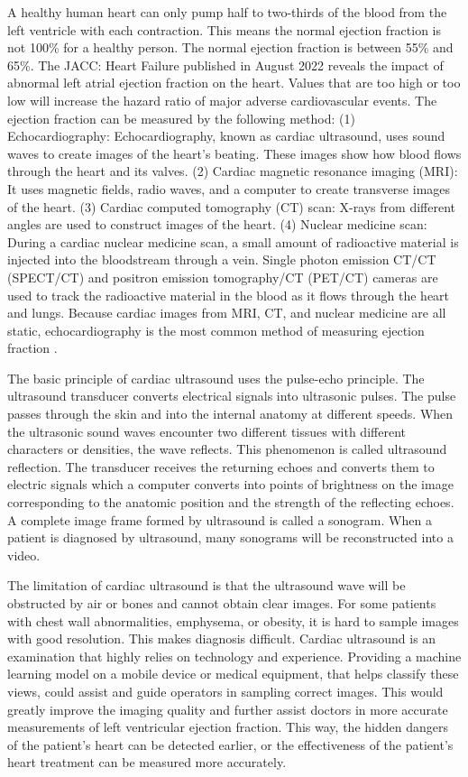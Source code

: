 \documentclass[11pt]{article}
\begin{document}
A healthy human heart can only pump half to two-thirds of the blood from the left ventricle with each contraction. This means the normal ejection fraction is not 100\% for a healthy person. The normal ejection fraction is between 55\% and 65\%. The JACC: Heart Failure published in August 2022 reveals the impact of abnormal left atrial ejection fraction on the heart. Values that are too high or too low will increase the hazard ratio of major adverse cardiovascular events. 
The ejection fraction can be measured by the following method: (1) Echocardiography: Echocardiography, known as cardiac ultrasound, uses sound waves to create images of the heart's beating. These images show how blood flows through the heart and its valves. (2) Cardiac magnetic resonance imaging (MRI): It uses magnetic fields, radio waves, and a computer to create transverse images of the heart. (3) Cardiac computed tomography (CT) scan: X-rays from different angles are used to construct images of the heart. (4) Nuclear medicine scan: During a cardiac nuclear medicine scan, a small amount of radioactive material is injected into the bloodstream through a vein. Single photon emission CT/CT (SPECT/CT) and positron emission tomography/CT (PET/CT) cameras are used to track the radioactive material in the blood as it flows through the heart and lungs. Because cardiac images from MRI, CT, and nuclear medicine are all static, echocardiography is the most common method of measuring ejection fraction \cite{shah2022supranormal}. 

The basic principle of cardiac ultrasound uses the pulse-echo principle. The ultrasound transducer converts electrical signals into ultrasonic pulses. The pulse passes through the skin and into the internal anatomy at different speeds. When the ultrasonic sound waves encounter two different tissues with different characters or densities, the wave reflects. This phenomenon is called ultrasound reflection. The transducer receives the returning echoes and converts them to electric signals which a computer converts into points of brightness on the image corresponding to the anatomic position and the strength of the reflecting echoes. A complete image frame formed by ultrasound is called a sonogram. When a patient is diagnosed by ultrasound, many sonograms will be reconstructed into a video. 


The limitation of cardiac ultrasound is that the ultrasound wave will be obstructed by air or bones and cannot obtain clear images. For some patients with chest wall abnormalities, emphysema, or obesity, it is hard to sample images with good resolution. This makes diagnosis difficult. Cardiac ultrasound is an examination that highly relies on technology and experience. Providing a machine learning model on a mobile device or medical equipment, that helps classify these views, could assist and guide operators in sampling correct images. This would greatly improve the imaging quality and further assist doctors in more accurate measurements of left ventricular ejection fraction. This way, the hidden dangers of the patient's heart can be detected earlier, or the effectiveness of the patient's heart treatment can be measured more accurately. 
\end{document}
